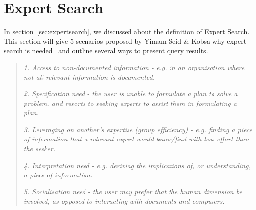 \section{Expert Search}\label{sec:background_expertsearch}
In section~\ref{sec:expertsearch}, we discussed about the definition of Expert Search. This section will give 5 scenarios proposed by Yimam-Seid \& Kobsa
why expert search is needed~\cite[P. 387]{expertsearch} and outline several ways to present query results.
\begin{quotation}
  \item \textit{1. Access to non-documented information - e.g. in an organisation where not all relevant information is documented.}
  \item \textit{2. Specification need - the user is unable to formulate a plan to solve a problem, and resorts to seeking experts to assist them in formulating a plan.}
  \item \textit{3. Leveraging on another's expertise (group efficiency) - e.g. finding a piece of information that a relevant expert would know/find with
  less effort than the seeker.}
  \item \textit{4. Interpretation need - e.g. deriving the implications of, or understanding, a piece of information.}
  \item \textit{5. Socialisation need - the user may prefer that the human dimension be involved, as opposed to interacting with documents and computers.}
\end{quotation}

